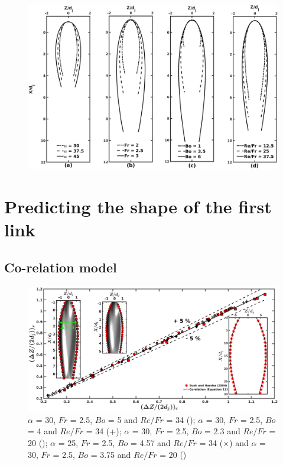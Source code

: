 \documentclass[%
aip,
sd,%
amsmath,amssymb,
preprint,%
author-year,%
]{revtex4-1}
\begin{document}
\cleardoublepage
\begin{figure}
	\centering
	\includegraphics[width=\linewidth]{finalContour}
	\caption{}
	\label{Figure::finalContours}
\end{figure}
\cleardoublepage
\section{Predicting the shape of the first link}
\label{Section::Models}
\subsection{Co-relation model}
\begin{figure}
	\centering
	\includegraphics[width=\linewidth]{corelatehx}
	\caption{$\alpha$ = 30, $Fr$ = 2.5, $Bo$ = 5 and $Re/Fr$ = 34 (\protect\MarkerSquareRed); $\alpha$ = 30, $Fr$ = 2.5, $Bo$ = 4 and $Re/Fr$ = 34 (+); $\alpha$ = 30, $Fr$ = 2.5, $Bo$ = 2.3 and $Re/Fr$ = 20 (\protect \MarkerDiamondBlack); $\alpha$ = 25, $Fr$ = 2.5, $Bo$ = 4.57 and $Re/Fr$ = 34 ($\times$) and $\alpha$ = 30, $Fr$ = 2.5, $Bo$ = 3.75 and $Re/Fr$ = 20 (\protect \MarkerCircleRed) }
	\label{Figure::corelatehx}
\end{figure}
\cleardoublepage
\end{document}
